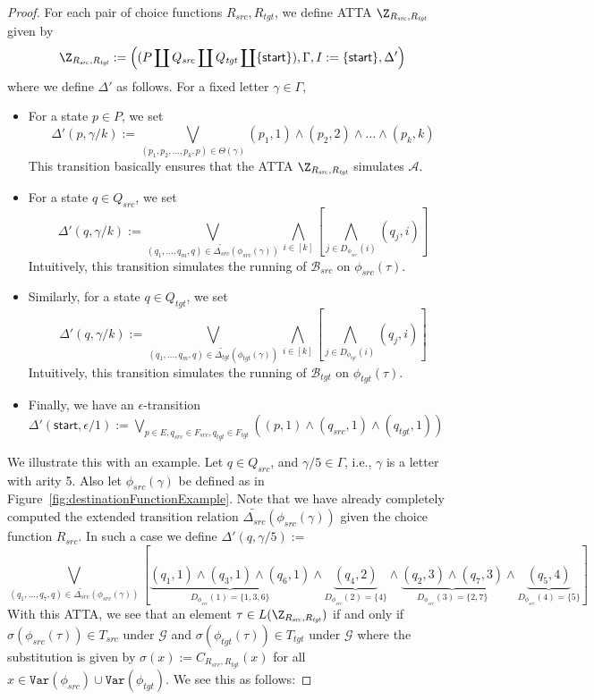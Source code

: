 \documentclass[12pt, a4paper]{article}
\newcommand{\Variables}{\texttt{Var}}
\newcommand{\Transitions}{\ensuremath{\Delta}}
\newcommand{\substitution}{\ensuremath{\sigma}}
\newcommand{\automaton}{\ensuremath{\mathcal{A}}}
\newcommand{\automatonB}{\ensuremath{\mathcal{B}}}
\newcommand{\guardFunction}{\ensuremath{\mathcal{G}}}
\newcommand{\stLang}{T}
\newcommand{\start}{\mathsf{start}}
\newcommand{\src}{\mathit{src}}
\newcommand{\sourceLang}{\ensuremath{\stLang_{\src}}}
\newcommand{\sourceAutomatonB}{\ensuremath{\automatonB_{\src}}}
\newcommand{\sourceMap}{\ensuremath{\phi_{\src}}}
\newcommand{\tgt}{\mathit{tgt}}
\newcommand{\targetLang}{\ensuremath{\stLang_{\tgt}}}
\newcommand{\targetAutomatonB}{\ensuremath{\automatonB_{\tgt}}}
\newcommand{\targetMap}{\ensuremath{\phi_{\tgt}}}
\begin{document}
\begin{proof}
    For each pair of choice functions $R_\src, R_\tgt$, we define ATTA $\Z_{R_\src, R_\tgt}$ given by
    \[ \Z_{R_\src, R_\tgt} := \left((P \coprod Q_\src \coprod Q_\tgt \coprod \{\start\}), \Gamma, I := \{\start\}, \Transitions'\right) \]
    where we define $\Transitions'$ as follows. For a fixed letter $\gamma \in \Gamma$,
    \begin{itemize}
        \item For a state $p \in P$, we set
        \[ \Transitions'(p, \gamma/k) := \bigvee_{(p_1, p_2, \dots, p_k, p) \in \Theta(\gamma)}(p_1, 1) \land (p_2, 2) \land \dots \land (p_k, k) \]
        This transition basically ensures that the ATTA $\Z_{R_\src, R_\tgt}$ simulates $\automaton$.
        \item For a state $q \in Q_\src$, we set
        \[ \Transitions'(q, \gamma/k) := \bigvee_{(q_1, \dots, q_m, q) \in \widetilde{\Transitions_\src}(\sourceMap(\gamma))} \bigwedge_{i \in [k]} \left[\bigwedge_{j \in D_{\sourceMap}(i)}(q_j, i)\right] \]
        Intuitively, this transition simulates the running of $\sourceAutomatonB$ on $\sourceMap(\tau)$.
        \item Similarly, for a state $q \in Q_\tgt$, we set
        \[ \Transitions'(q, \gamma/k) := \bigvee_{(q_1, \dots, q_m, q) \in \widetilde{\Transitions_\tgt}(\targetMap(\gamma))} \bigwedge_{i \in [k]} \left[\bigwedge_{j \in D_{\targetMap}(i)}(q_j, i)\right] \]
        Intuitively, this transition simulates the running of $\targetAutomatonB$ on $\targetMap(\tau)$.
        \item Finally, we have an $\epsilon$-transition $\Transitions'(\start, \epsilon/1) := \bigvee_{p \in E, q_\src \in F_\src, q_\tgt \in F_\tgt}((p, 1) \land (q_\src, 1) \land (q_\tgt, 1))$
    \end{itemize}

    We illustrate this with an example. Let $q \in Q_\src$, and $\gamma/5 \in \Gamma$, i.e., $\gamma$ is a letter with arity 5. Also let $\sourceMap(\gamma)$ be defined as in Figure~\ref{fig:destinationFunctionExample}. Note that we have already completely computed the extended transition relation $\widetilde{\Transitions_\src}(\sourceMap(\gamma))$ given the choice function $R_\src$. In such a case we define $        \Transitions'(q, \gamma/5) :=$
    \[
    \bigvee_{(q_1, \dots, q_7, q) \in \widetilde{\Transitions_\src}(\sourceMap(\gamma))} \left[ \underbrace{(q_1, 1) \land (q_3, 1) \land (q_6, 1)}_{D_{\sourceMap}(1) = \{1, 3, 6\}} \land \underbrace{(q_4, 2)}_{D_{\sourceMap}(2) = \{4\}} \land \underbrace{(q_2, 3) \land (q_7, 3)}_{D_{\sourceMap}(3) = \{2, 7\}} \land \underbrace{(q_5, 4)}_{D_{\sourceMap}(4) = \{5\}} \right]
    \]
    With this ATTA, we see that an element $\tau \in L(\Z_{R_\src, R_\tgt})$ if and only if $\substitution(\sourceMap(\tau)) \in \sourceLang$ under $\guardFunction$ and $\substitution(\targetMap(\tau)) \in \targetLang$ under $\guardFunction$ where the substitution is given by $\substitution(x) := C_{R_\src, R_\tgt}(x)$ for all $x \in \Variables(\sourceMap) \cup \Variables(\targetMap)$. We see this as follows:


\end{proof}
\end{document}
